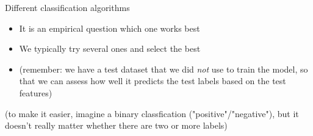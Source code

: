 \documentclass[handout]{beamer}
\begin{document}
\begin{frame}[plain]
\begin{columns}[]
\end{columns}

\end{frame}





\begin{frame}{Different classification algorithms}

\begin{itemize}[<+->]
\item It is an empirical question which one works best
\item We typically try several ones and select the best
\item (remember: we have a test dataset that we did \emph{not} use to train the model, so that we can assess how well it predicts the test labels based on the test features)
\end{itemize}
(to make it easier, imagine a binary classfication ("positive"/"negative"), but it doesn't really matter whether there are two or more labels)
\end{frame}
\end{document}
